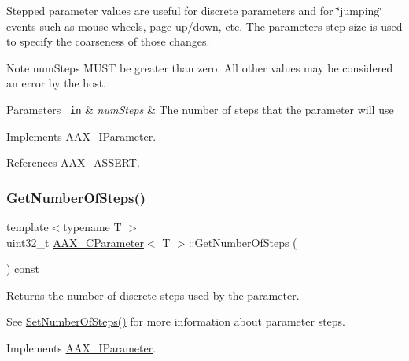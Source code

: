 Stepped parameter values are useful for discrete parameters and for \char`\"{}jumping\char`\"{} events such as mouse wheels, page up/down, etc. The parameter\textquotesingle{}s step size is used to specify the coarseness of those changes.

\begin{DoxyNote}{Note}
num\+Steps M\+U\+ST be greater than zero. All other values may be considered an error by the host.
\end{DoxyNote}

\begin{DoxyParams}[1]{Parameters}
\mbox{\texttt{ in}}  & {\em num\+Steps} & The number of steps that the parameter will use \\
\hline
\end{DoxyParams}


Implements \mbox{\hyperlink{a01857_ac81903d0388a03045a57dd4c455b6f02}{A\+A\+X\+\_\+\+I\+Parameter}}.



References A\+A\+X\+\_\+\+A\+S\+S\+E\+RT.

\mbox{\label{a01537_afe660c842ca2bc05acb249def909e5e9}} 
\subsubsection{\texorpdfstring{GetNumberOfSteps()}{GetNumberOfSteps()}}
{\footnotesize\ttfamily template$<$typename T $>$ \\
uint32\+\_\+t \mbox{\hyperlink{a01537}{A\+A\+X\+\_\+\+C\+Parameter}}$<$ T $>$\+::Get\+Number\+Of\+Steps (\begin{DoxyParamCaption}{ }\end{DoxyParamCaption}) const\hspace{0.3cm}{\ttfamily [virtual]}}



Returns the number of discrete steps used by the parameter. 

See \mbox{\hyperlink{a01537_ac1c0ee92affe0379a58411955d27bb2b}{Set\+Number\+Of\+Steps()}} for more information about parameter steps. 

Implements \mbox{\hyperlink{a01857_af2a4893e048666aca929846e7b5634cd}{A\+A\+X\+\_\+\+I\+Parameter}}.

\mbox{\label{a01537_a9743c6c0416e93078f377c40e9482021}} 
